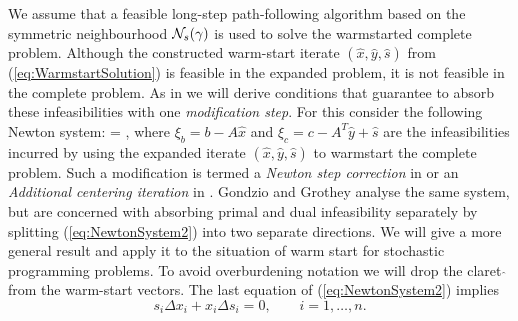 We assume that a feasible long-step path-following algorithm based on
the symmetric neighbourhood $\mathcal{N}_s(\gamma)$ 
is used to solve the warmstarted complete problem. 
Although the constructed warm-start iterate $(\hat{x}, \hat{y}, \hat{s})$ 
from (\ref{eq:WarmstartSolution}) is feasible in the expanded problem, 
it is not feasible in the complete problem. 
As in \cite{YildirimWright,GondzioGrothey03} we will derive
conditions that guarantee to absorb these infeasibilities with one
{\em modification step}. 
For this consider the following Newton system:
\be \label{eq:NewtonSystem2}
 = 
\left[ \begin{array}{c}
    \xi_b \\ \xi_c \\ 0
  \end{array} \right],
\ee
where $\xi_b = b - A\hat{x}$ and $\xi_c = c - A^T\hat{y}+\hat{s}$ are the
infeasibilities incurred by using the expanded iterate $(\hat{x},
\hat{y}, \hat{s})$ to warmstart the complete problem. 
Such a modification is termed a {\em Newton step correction} in
\cite{YildirimWright} or an {\em Additional centering iteration}
in \cite{GondzioGrothey06}. 
Gondzio and Grothey \cite{GondzioGrothey03} analyse the
same system, but are concerned with absorbing primal and dual
infeasibility separately by splitting (\ref{eq:NewtonSystem2}) into
two separate directions.
We will give a more general result and apply it to the situation of
warm start for stochastic programming problems. To avoid overburdening
notation we will drop the claret $\hat{}$ from the warm-start vectors.
The last equation of (\ref{eq:NewtonSystem2}) implies
\[
 s_i\Delta x_i + x_i\Delta s_i = 0, \qquad i = 1, \ldots, n.
\]


